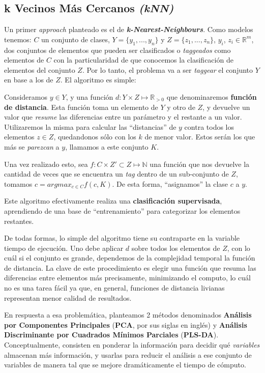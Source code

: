 \subsection{k Vecinos M\'as Cercanos \textit{(kNN)}}\label{intro_knn}

Un primer \textit{approach} planteado es el de \textit{\textbf{k-Nearest-Neighbours}}. Como modelos tenemos: $C$ un conjunto de clases, $Y = \{y_{1}, ..., y_{n}\}$ y $Z = \{z_{1}, ..., z_{n}\}$, $y_{i}$, $z_{i} \in \mathbb{R}^m$, dos conjuntos de elementos que pueden ser clasificados o \textit{taggeados} como elementos de $C$ con la particularidad de que conocemos la clasificaci\'on de elementos del conjunto $Z$. Por lo tanto, el problema va a ser \textit{taggear} el conjunto $Y$ en base a los de $Z$. El algoritmo es simple:

Consideramos $y \in Y$, y una funci\'on $d : Y \times Z \mapsto \mathbb{R}_{> 0}$ que denominaremos \textbf{funci\'on de distancia}. Esta funci\'on toma un elemento de $Y$ y otro de $Z$, y devuelve un valor que \textit{resume} las diferencias entre un par\'ametro y el restante a un valor. Utilizaremos la misma para calcular las ``distancias'' de $y$ contra todos los elementos $z \in Z$, quedandonos s\'olo con los $k$ de menor valor. Estos ser\'an los que m\'as se \textit{parezcan} a $y$, llamamos a este conjunto $K$.

Una vez realizado esto, sea $f : C \times Z' \subset Z \mapsto \mathbb{N}$ una funci\'on que nos devuelve la cantidad de veces que se encuentra un \textit{tag} dentro de un sub-conjunto de $Z$, tomamos $c = argmax_{c \in C} f(c, K)$. De esta forma, ``asignamos'' la clase $c$ a $y$.

Este algoritmo efectivamente realiza una \textbf{clasificaci\'on supervisada}, aprendiendo de una base de ``entrenamiento'' para categorizar los elementos restantes.

De todas formas, lo simple del algoritmo tiene su contraparte en la variable tiempo de ejecuci\'on. Uno debe aplicar $d$ sobre todos los elementos de $Z$, con lo cu\'al si el conjunto es grande, dependemos de la complejidad temporal la funci\'on de distancia. La clave de este procedimiento es elegir una funci\'on que resuma las diferencias entre elementos m\'as precisamente, minimizando el computo, lo cu\'al no es una tarea f\'acil ya que, en general, funciones de distancia livianas representan menor calidad de resultados.

En respuesta a esa problem\'atica, planteamos 2 m\'etodos denominados \textbf{An\'alisis por Componentes Principales} (\textbf{PCA}, por sus siglas en ingl\'es) y \textbf{An\'alisis Discriminante por Cuadrados M\'inimos Parciales} (\textbf{PLS-DA}). Conceptualmente, consisten en ponderar la informaci\'on para decidir qu\'e \textit{variables} almacenan m\'as informaci\'on, y usarlas para reducir el an\'alisis a ese conjunto de variables de manera tal que se mejore dram\'aticamente el tiempo de c\'omputo.

